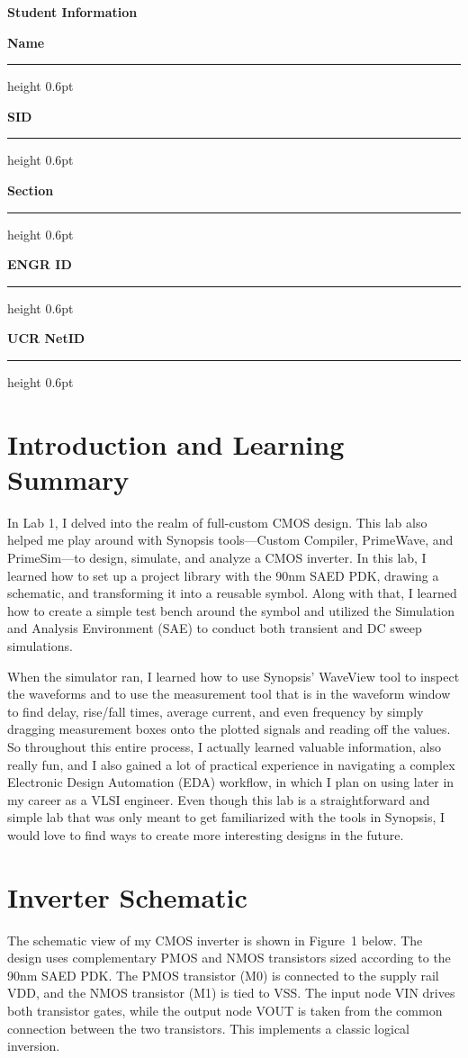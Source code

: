 \documentclass[11pt]{article}
\newcommand{\reporttitle}{%
  \noindent{\color{ucrBlue}\bfseries\fontsize{32}{34}\selectfont EECS 168 -- Lab 1 Report}\par\vspace{0.4em}}
\newcommand{\infrow}[2]{%
  \noindent\textbf{#1}\hspace{1.5em}%
  \makebox[0pt][l]{\raisebox{0.6ex}{#2}}%
  \leaders\hrule height 0.6pt\hfill\kern0pt%
  \par\vspace{0.9em}}
\begin{document}
\newif\ifusefacsimile
\IfFileExists{lab1-vvada002.pdf}{\usefacsimiletrue}{\usefacsimilefalse}
\ifusefacsimile
  
  \clearpage
\else

\reporttitle

{\color{ucrOrange}\Large\bfseries Student Information}
\color{ucrOrange}\titlerule
\color{black}\vspace{0.6em}

\infrow{Name}{Kaushik Vada}
\infrow{SID}{862441522}
\infrow{Section}{023}
\infrow{ENGR ID}{vvada002}
\infrow{UCR NetID}{vvada002}

\section*{Introduction and Learning Summary}
In Lab 1, I delved into the realm of full-custom CMOS design. This lab also helped me play around with Synopsis tools---Custom Compiler, PrimeWave, and PrimeSim---to design, simulate, and analyze a CMOS inverter. In this lab, I learned how to set up a project library with the 90nm SAED PDK, drawing a schematic, and transforming it into a reusable symbol. Along with that, I learned how to create a simple test bench around the symbol and utilized the Simulation and Analysis Environment (SAE) to conduct both transient and DC sweep simulations.

When the simulator ran, I learned how to use Synopsis’ WaveView tool to inspect the waveforms and to use the measurement tool that is in the waveform window to find delay, rise/fall times, average current, and even frequency by simply dragging measurement boxes onto the plotted signals and reading off the values. So throughout this entire process, I actually learned valuable information, also really fun, and I also gained a lot of practical experience in navigating a complex Electronic Design Automation (EDA) workflow, in which I plan on using later in my career as a VLSI engineer. Even though this lab is a straightforward and simple lab that was only meant to get familiarized with the tools in Synopsis, I would love to find ways to create more interesting designs in the future.

\section*{Inverter Schematic}
The schematic view of my CMOS inverter is shown in Figure~1 below. The design uses complementary PMOS and NMOS transistors sized according to the 90nm SAED PDK. The PMOS transistor (M0) is connected to the supply rail VDD, and the NMOS transistor (M1) is tied to VSS. The input node VIN drives both transistor gates, while the output node VOUT is taken from the common connection between the two transistors. This implements a classic logical inversion.
\end{document}
